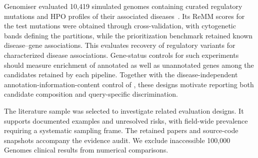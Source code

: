 \documentclass{article}
\begin{document}
Genomiser evaluated 10{,}419 simulated genomes containing curated
regulatory mutations and HPO profiles of their associated
diseases~\citep{smedley2016genomiser}. Its ReMM scores for the test mutations
were obtained through cross-validation, with cytogenetic bands defining
the partitions, while the prioritization benchmark retained known
disease--gene associations. This evaluates recovery of regulatory variants
for characterized disease associations. Gene-status controls for such
experiments should measure enrichment of annotated as well as unannotated
genes among the candidates retained by each pipeline. Together with the
disease-independent annotation-information-content control of
\citet{alghamdi2022contribution}, these designs motivate reporting both
candidate composition and query-specific discrimination.


The literature sample was selected to investigate related evaluation designs.
It supports documented examples and unresolved risks, with field-wide
prevalence requiring a systematic sampling frame. The retained papers and
source-code snapshots accompany the evidence audit. We exclude inaccessible
100,000 Genomes clinical results from numerical comparisons.

\FloatBarrier
\setlength{\bibsep}{3pt}


\end{document}
